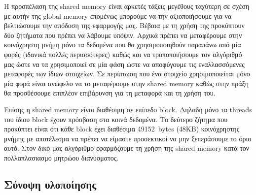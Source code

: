 \noindent Η προσπέλαση της shared memory είναι αρκετές τάξεις μεγέθους ταχύτερη σε σχέση με αυτήν της global memory επομένως μπορούμε να την αξιοποιήσουμε για να βελτιώσουμε την απόδοση της εφαρμογής μας. Βέβαια με τη χρήση της προκύπτουν δύο ζητήματα που πρέπει να λάβουμε υπόψιν. Αρχικά πρέπει να μεταφέρουμε στην κοινόχρηστη μνήμη μόνο τα δεδομένα που θα χρησιμοποιηθούν παραπάνω από μία φορές (ιδανικά πολλές περισσότερες) καθώς και να τροποποιήσουμε τον αλγόριθμό μας ώστε να τα χρησιμοποιεί σε μία φάση ώστε να αποφύγουμε τις εναλλασσόμενες μεταφορές των ίδιων στοιχείων. Σε περίπτωση που ένα στοιχείο χρησιμοποιείται μόνο μία φορά είναι ανώφελο να το μεταφέρουμε στην shared memory καθώς στην πράξη θα προσθέσουμε επιπλέον επιβάρυνση για τη μεταφορά και τη χρήση του.

Επίσης η shared memory είναι διαθέσιμη σε επίπεδο block. Δηλαδή μόνο τα threads του ίδιου block έχουν πρόσβαση στα κοινά δεδομένα. Το δεύτερο ζήτημα που προκύπτει είναι ότι κάθε block έχει διαθέσιμα \mbox{49152 bytes} (48KB) κοινόχρηστης μνήμης με αποτέλεσμα να πρέπει να είμαστε προσεκτικοί να μην ξεπεράσουμε το όριο αυτό. Στον δικό μας αλγόριθμο εφαρμόζουμε τη χρήση της shared memory κατά τον πολλαπλασιασμό μητρώου διανύσματος.

\newpage

\subsection*{Σύνοψη υλοποίησης}

